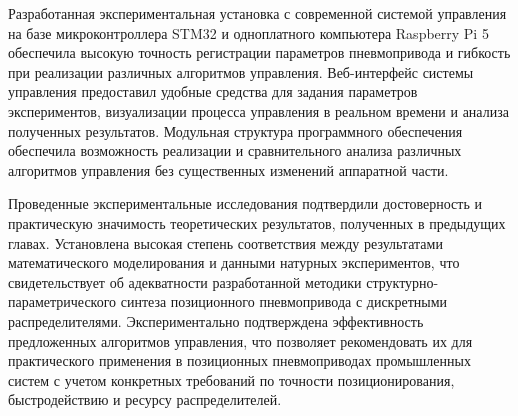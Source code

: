 Разработанная экспериментальная установка с современной системой управления на базе микроконтроллера STM32 и
одноплатного компьютера Raspberry Pi 5 обеспечила высокую точность регистрации параметров пневмопривода и гибкость
при реализации различных алгоритмов управления. Веб-интерфейс системы управления предоставил удобные средства для задания
параметров экспериментов, визуализации процесса управления в реальном времени и анализа полученных результатов. Модульная
структура программного обеспечения обеспечила возможность реализации и сравнительного анализа различных алгоритмов
управления без существенных изменений аппаратной части.

Проведенные экспериментальные исследования подтвердили достоверность и практическую значимость теоретических результатов,
полученных в предыдущих главах. Установлена высокая степень соответствия между результатами математического моделирования
и данными натурных экспериментов, что свидетельствует об адекватности разработанной методики структурно-параметрического
синтеза позиционного пневмопривода с дискретными распределителями. Экспериментально подтверждена эффективность предложенных
алгоритмов управления, что позволяет рекомендовать их для практического применения в позиционных пневмоприводах промышленных
систем с учетом конкретных требований по точности позиционирования, быстродействию и ресурсу распределителей.